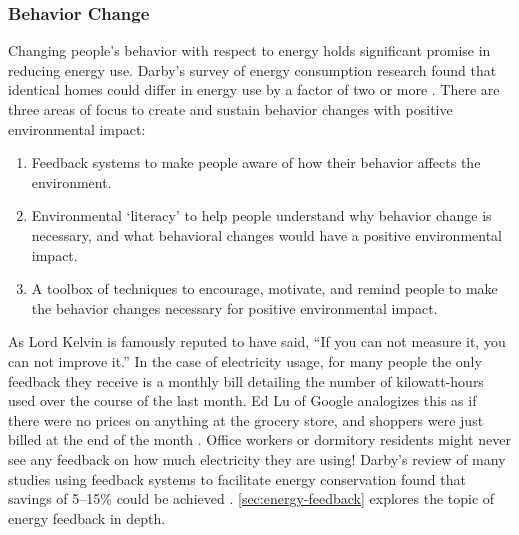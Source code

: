 
\subsubsection{Behavior Change}

Changing people's behavior with respect to energy holds significant promise in reducing energy use. Darby's survey of energy consumption research found that identical homes could differ in energy use by a factor of two or more \cite{darby-review-2006}. There are three areas of focus to create and sustain behavior changes with positive environmental impact:

\begin{enumerate}

\item Feedback systems to make people aware of how their behavior affects the environment.

\item Environmental `literacy' to help people understand why behavior change is necessary, and what behavioral changes would have a positive environmental impact.

\item A toolbox of techniques to encourage, motivate, and remind people to make the behavior changes necessary for positive environmental impact.

\end{enumerate}

As Lord Kelvin is famously reputed to have said, ``If you can not measure it, you can not improve it.'' In the case of electricity usage, for many people the only feedback they receive is a monthly bill detailing the number of kilowatt-hours used over the course of the last month. Ed Lu of Google analogizes this as if there were no prices on anything at the grocery store, and shoppers were just billed at the end of the month \cite{Helft2008Googles-Energy}. Office workers or dormitory residents might never see any feedback on how much electricity they are using! Darby's review of many studies using feedback systems to facilitate energy conservation found that savings of 5--15\% could be achieved \cite{darby-review-2006}. \ref{sec:energy-feedback} explores the topic of energy feedback in depth.

